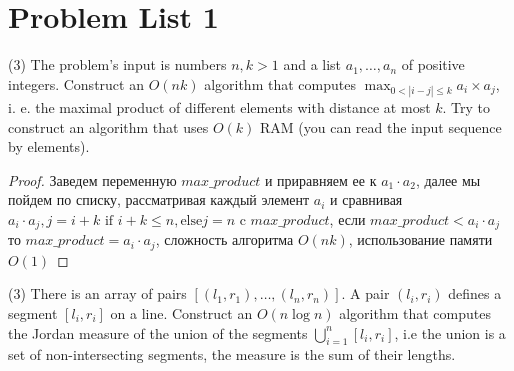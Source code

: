 \section{Problem List 1}

\begin{prob}
(3) The problem's input is numbers $n, k>1$ and a list $a_1, \ldots, a_n$ of positive integers. Construct an $O(n k)$ algorithm that computes $\max_{0<|i-j| \leqslant k} a_i \times a_j$, i. e. the maximal product of different elements with distance at most $k$. Try to construct an algorithm that uses $O(k)$ RAM (you can read the input sequence by elements).
\end{prob}

\begin{proof}
Заведем переменную $max\_product$ и приравняем ее к $a_1 \cdot a_2$, далее мы пойдем по списку, рассматривая каждый элемент $a_i$ и сравнивая $a_i \cdot a_j, j = i+k \text{ if } i+k \leq n, \text{else} j = n$ c $max\_product$, если $max\_product < a_i \cdot a_j$ то $max\_product = a_i \cdot a_j$, сложность алгоритма $O(nk)$, использование памяти $O(1)$
\end{proof}
\vskip 0.4in




\begin{prob}
(3) There is an array of pairs $\left[\left(l_1, r_1\right), \ldots,\left(l_n, r_n\right)\right]$. A pair $\left(l_i, r_i\right)$ defines a segment $\left[l_i, r_i\right]$ on a line. Construct an $O(n \log n)$ algorithm that computes the Jordan measure of the union of the segments $\bigcup_{i=1}^n\left[l_i, r_i\right]$, i.e the union is a set of non-intersecting segments, the measure is the sum of their lengths.
\end{prob}

